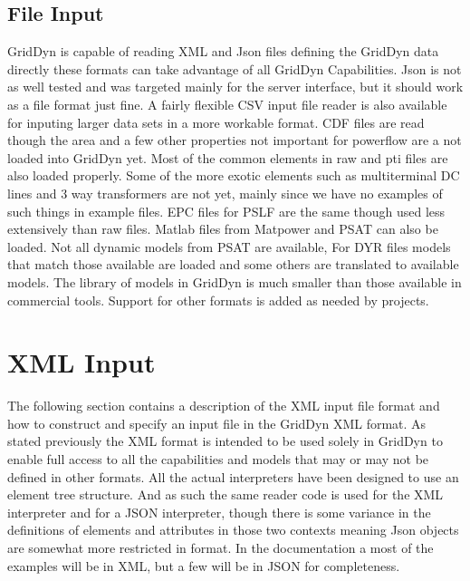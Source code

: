 \documentclass[12pt]{article} %
\begin{document}
\subsection{File Input}
GridDyn is capable of reading XML and Json files defining the GridDyn data directly these formats can take advantage of all GridDyn Capabilities.  Json is not as well tested and was targeted mainly for the server interface, but it should work as a file format just fine.  A fairly flexible CSV input file reader is also available for inputing larger data sets in a more workable format.  CDF files are read though the area and a few other properties not important for powerflow are a not loaded into GridDyn yet.  Most of the common elements in raw and pti files are also loaded properly.  Some of the more exotic elements such as multiterminal DC lines and 3 way transformers are not yet, mainly since we have no examples of such things in example files.  EPC files for PSLF are the same though used less extensively than raw files.  Matlab files from Matpower and PSAT can also be loaded.  Not all dynamic models from PSAT are available,  For DYR files models that match those available are loaded and some others are translated to available models.  The library of models in GridDyn is much smaller than those available in commercial tools.  Support for other formats is added as needed by projects.

\section {XML Input}
The following section contains a description of the XML input file format and how to construct and specify an input file in the GridDyn XML format.   As stated previously the XML format is intended to be used solely in GridDyn to enable full access to all the capabilities and models that may or may not be defined in other formats.  All the actual interpreters have been designed to use an element tree structure.  And as such the same reader code is used for the XML interpreter and for a JSON interpreter, though there is some variance in the definitions of elements and attributes in those two contexts meaning Json objects are somewhat more restricted in format.  In the documentation a most of the examples will be in XML, but a few will be in JSON for completeness.  
\end{document}
